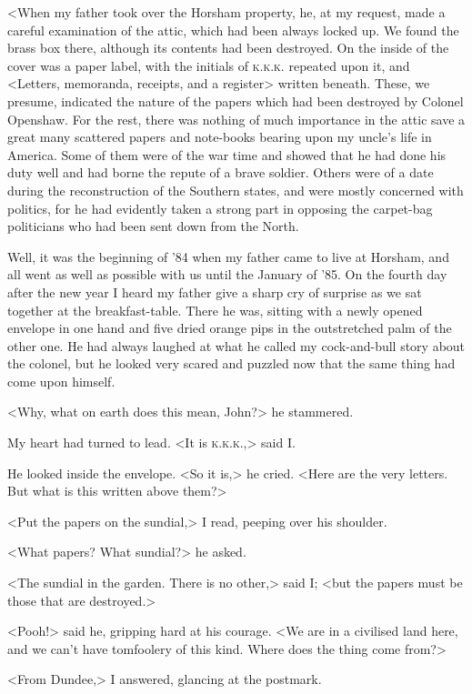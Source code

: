 <When my father took over the Horsham property, he, at my request, made a careful examination of the attic, which had been always locked up. We found the brass box there, although its contents had been destroyed. On the inside of the cover was a paper label, with the initials of \textsc{k.k.k.} repeated upon it, and <Letters, memoranda, receipts, and a register> written beneath. These, we presume, indicated the nature of the papers which had been destroyed by Colonel Openshaw. For the rest, there was nothing of much importance in the attic save a great many scattered papers and note-books bearing upon my uncle's life in America. Some of them were of the war time and showed that he had done his duty well and had borne the repute of a brave soldier. Others were of a date during the reconstruction of the Southern states, and were mostly concerned with politics, for he had evidently taken a strong part in opposing the carpet-bag politicians who had been sent down from the North.

Well, it was the beginning of '84 when my father came to live at Horsham, and all went as well as possible with us until the January of '85. On the fourth day after the new year I heard my father give a sharp cry of surprise as we sat together at the breakfast-table. There he was, sitting with a newly opened envelope in one hand and five dried orange pips in the outstretched palm of the other one. He had always laughed at what he called my cock-and-bull story about the colonel, but he looked very scared and puzzled now that the same thing had come upon himself.

<Why, what on earth does this mean, John?> he stammered.

My heart had turned to lead. <It is \textsc{k.k.k.},> said I\@.

He looked inside the envelope. <So it is,> he cried. <Here are the very letters. But what is this written above them?>

<Put the papers on the sundial,> I read, peeping over his shoulder.

<What papers? What sundial?> he asked.

<The sundial in the garden. There is no other,> said I; <but the papers must be those that are destroyed.>

<Pooh!> said he, gripping hard at his courage. <We are in a civilised land here, and we can't have tomfoolery of this kind. Where does the thing come from?>

<From Dundee,> I answered, glancing at the postmark.

